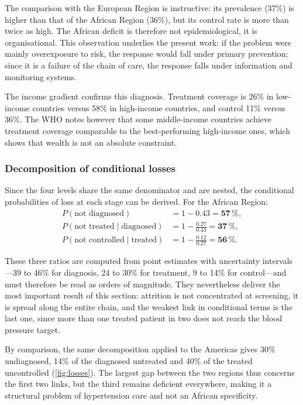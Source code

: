 \documentclass[12pt,a4paper,oneside]{report}
\begin{document}
The comparison with the European Region is instructive: its prevalence (37\%) is higher than that of the African Region (36\%), but its control rate is more than twice as high. The African deficit is therefore not epidemiological, it is organisational. This observation underlies the present work: if the problem were mainly overexposure to risk, the response would fall under primary prevention; since it is a failure of the chain of care, the response falls under information and monitoring systems.

The income gradient confirms this diagnosis. Treatment coverage is 26\% in low-income countries versus 58\% in high-income countries, and control 11\% versus 36\%. The WHO notes however that some middle-income countries achieve treatment coverage comparable to the best-performing high-income ones, which shows that wealth is not an absolute constraint.

\subsubsection{Decomposition of conditional losses}

Since the four levels share the same denominator and are nested, the conditional probabilities of loss at each stage can be derived. For the African Region:
\begin{align}
  P(\text{not diagnosed}) &= 1 - 0.43 = \mathbf{57\,\%},\\
  P(\text{not treated}\mid\text{diagnosed}) &= 1 - \frac{0.27}{0.43} = \mathbf{37\,\%},\\
  P(\text{not controlled}\mid\text{treated}) &= 1 - \frac{0.12}{0.27} = \mathbf{56\,\%}.
\end{align}

These three ratios are computed from point estimates with uncertainty intervals---39 to 46\% for diagnosis, 24 to 30\% for treatment, 9 to 14\% for control---and must therefore be read as orders of magnitude. They nevertheless deliver the most important result of this section: attrition is not concentrated at screening, it is spread along the entire chain, and the weakest link in conditional terms is the last one, since more than one treated patient in two does not reach the blood pressure target.

By comparison, the same decomposition applied to the Americas gives 30\% undiagnosed, 14\% of the diagnosed untreated and 40\% of the treated uncontrolled (\cref{fig:losses}). The largest gap between the two regions thus concerns the first two links, but the third remains deficient everywhere, making it a structural problem of hypertension care and not an African specificity.
\end{document}
